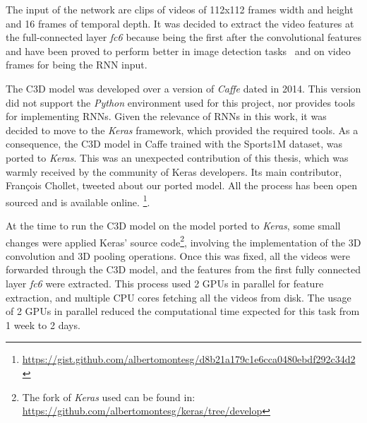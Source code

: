 The input of the network are clips of videos of 112x112 frames width and height and 16 frames of temporal depth. It was decided to extract the video features at the full-connected layer \textit{fc6} because being the first after the convolutional features and have been proved to perform better in image detection tasks~\cite{girshick2014rich} and on video frames for being the RNN input\cite{donahue2015long}.

The C3D model \cite{tran2014learning} was developed over a version of \textit{Caffe}\cite{jia2014caffe} dated in 2014. This version did not support the \textit{Python} environment used for this project, nor provides tools for implementing RNNs. Given the relevance of RNNs in this work, it was decided to move to the \textit{Keras} framework, which provided the required tools. As a consequence, the C3D model in Caffe  trained with the Sports1M\cite{KarpathyCVPR14} dataset, was ported to \textit{Keras}. This was an unexpected contribution of this thesis, which was warmly received by the community of Keras developers. Its main contributor, François Chollet, tweeted about our ported model. All the process has been open sourced and is available online. \footnote{ \url{https://gist.github.com/albertomontesg/d8b21a179c1e6cca0480ebdf292c34d2}}.


At the time to run the C3D model on the model ported to \textit{Keras}, some small changes were applied Keras' source code\footnote{The fork of \textit{Keras} used can be found in: \url{https://github.com/albertomontesg/keras/tree/develop}}, involving the implementation of the 3D convolution and 3D pooling operations. Once this was fixed, all the videos were forwarded through the C3D model, and the features from the first fully connected layer \textit{fc6} were extracted. This process used 2 GPUs in parallel for feature extraction, and multiple CPU cores fetching all the videos from disk. The usage of 2 GPUs in parallel reduced the computational time expected for this task from 1 week to 2 days.


